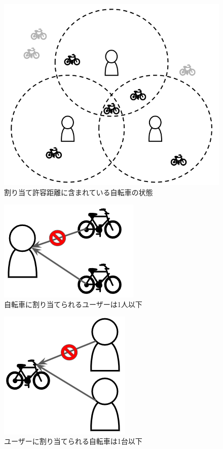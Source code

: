       \begin{figure}[htbp]
        \centering
        \includegraphics[scale=0.45]
        {figures/objectFunction1.png}
        \caption{割り当て許容距離に含まれている自転車の状態}
        \label{fig:割り当て許容距離に含まれている自転車の状態}
      \end{figure}
      
      \begin{figure}[htbp]
        \centering
        \includegraphics[scale=1.18]
        {figures/objectFunction2.png}
        \caption{自転車に割り当てられるユーザーは1人以下}
        \label{fig:自転車に割り当てられるユーザーは1人以下}
      \end{figure}
      
      \begin{figure}[b!]
        \centering
        \includegraphics[scale=1.2]
        {figures/objectFunction3.png}
        \caption{ユーザーに割り当てられる自転車は1台以下}
        \label{fig:ユーザーに割り当てられる自転車は1台以下}
      \end{figure}

